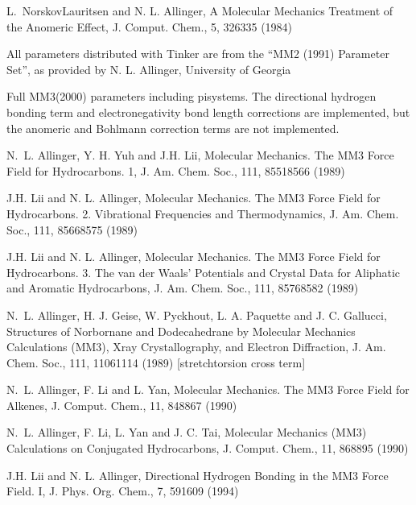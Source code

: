 \documentclass[letterpaper,11pt,english]{sphinxmanual}
\begin{document}
\sphinxAtStartPar
L. Norskov\sphinxhyphen{}Lauritsen and N. L. Allinger, A Molecular Mechanics Treatment of the Anomeric Effect, J. Comput. Chem., 5, 326\sphinxhyphen{}335 (1984)

\sphinxAtStartPar
All parameters distributed with Tinker are from the “MM2 (1991) Parameter Set”, as provided by N. L. Allinger, University of Georgia

\sphinxAtStartPar
{}

\sphinxAtStartPar
Full MM3(2000) parameters including pi\sphinxhyphen{}systems. The directional hydrogen bonding term and electronegativity bond length corrections are implemented, but the anomeric and Bohlmann correction terms are not implemented.

\sphinxAtStartPar
N. L. Allinger, Y. H. Yuh and J.\sphinxhyphen{}H. Lii, Molecular Mechanics. The MM3 Force Field for Hydrocarbons. 1, J. Am. Chem. Soc., 111, 8551\sphinxhyphen{}8566 (1989)

\sphinxAtStartPar
J.\sphinxhyphen{}H. Lii and N. L. Allinger, Molecular Mechanics. The MM3 Force Field for Hydrocarbons. 2. Vibrational Frequencies and Thermodynamics, J. Am. Chem. Soc., 111, 8566\sphinxhyphen{}8575 (1989)

\sphinxAtStartPar
J.\sphinxhyphen{}H. Lii and N. L. Allinger, Molecular Mechanics. The MM3 Force Field for Hydrocarbons. 3. The van der Waals’ Potentials and Crystal Data for Aliphatic and Aromatic Hydrocarbons, J. Am. Chem. Soc., 111, 8576\sphinxhyphen{}8582 (1989)

\sphinxAtStartPar
N. L. Allinger, H. J. Geise, W. Pyckhout, L. A. Paquette and J. C. Gallucci, Structures of Norbornane and Dodecahedrane by Molecular Mechanics Calculations (MM3), X\sphinxhyphen{}ray Crystallography, and Electron Diffraction, J. Am. Chem. Soc., 111, 1106\sphinxhyphen{}1114 (1989)  {[}stretch\sphinxhyphen{}torsion cross term{]}

\sphinxAtStartPar
N. L. Allinger, F. Li and L. Yan, Molecular Mechanics. The MM3 Force Field for Alkenes, J. Comput. Chem., 11, 848\sphinxhyphen{}867 (1990)

\sphinxAtStartPar
N. L. Allinger, F. Li, L. Yan and J. C. Tai, Molecular Mechanics (MM3) Calculations on Conjugated Hydrocarbons, J. Comput. Chem., 11, 868\sphinxhyphen{}895 (1990)

\sphinxAtStartPar
J.\sphinxhyphen{}H. Lii and N. L. Allinger, Directional Hydrogen Bonding in the MM3 Force Field. I, J. Phys. Org. Chem., 7, 591\sphinxhyphen{}609 (1994)
\end{document}
